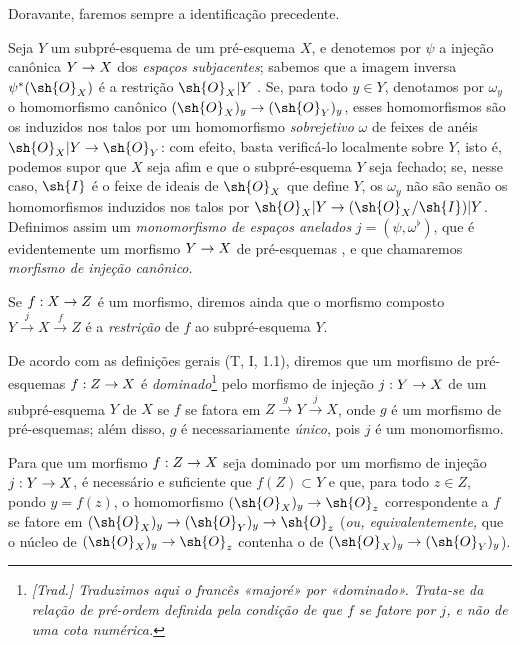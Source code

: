 \documentclass[oneside]{amsart}
\makeatletter
\newcommand{\ega@arrow}[2]{\mathchoice{#1}{#2}{#2}{#2}}
\renewcommand{\to}{\ega@arrow{\longrightarrow}{\rightarrow}}
\let\EGAOriginalLabel\label
\renewcommand{\label}[1]{\phantomsection\EGAOriginalLabel{#1}}
\makeatother
\begin{document}
Doravante, faremos sempre a identificação precedente.

\begin{env}[4.1.7]
\label{I.4.1.7}
Seja $Y$ um subpré-esquema de um pré-esquema $X$, e denotemos por $\psi$ a injeção canônica $Y\to X$ dos \emph{espaços subjacentes};
sabemos que a imagem inversa $\psi^*(\sh{O}_X)$ é a restrição $\sh{O}_X|Y$ .
Se, para todo $y\in Y$, denotamos por $\omega_y$ o homomorfismo canônico $(\sh{O}_X)_y\to(\sh{O}_Y)_y$, esses homomorfismos são os induzidos nos talos por um homomorfismo \emph{sobrejetivo} $\omega$ de feixes de anéis $\sh{O}_X|Y\to\sh{O}_Y$: com efeito, basta verificá-lo localmente sobre $Y$, isto é, podemos supor que $X$ seja afim e que o subpré-esquema $Y$ seja fechado; se, nesse caso, $\sh{I}$ é o feixe de ideais de $\sh{O}_X$ que define $Y$, os $\omega_y$ não são senão os homomorfismos induzidos nos talos por $\sh{O}_X|Y\to(\sh{O}_X/\sh{I})|Y$.
Definimos assim um \emph{monomorfismo de espaços anelados}  $j=(\psi,\omega^\flat)$, que é evidentemente um morfismo $Y\to X$ de pré-esquemas , e que chamaremos \emph{morfismo de injeção canônico}.

Se $f:X\to Z$ é um morfismo, diremos ainda que o morfismo composto $Y\xrightarrow{j}X\xrightarrow{f}Z$ é a \emph{restrição} de $f$ ao subpré-esquema $Y$.
\end{env}

\begin{env}[4.1.8]
\label{I.4.1.8}
De acordo com as definições gerais (T, I, 1.1), diremos que um morfismo de pré-esquemas $f:Z\to X$ é \emph{dominado}\footnote{\emph{[Trad.] Traduzimos aqui o francês «majoré» por «dominado». Trata-se da relação de pré-ordem definida pela condição de que $f$ se fatore por $j$, e não de uma cota numérica.}} pelo morfismo de injeção $j:Y\to X$ de um subpré-esquema $Y$ de $X$ se $f$ se fatora em $Z\xrightarrow{g}Y\xrightarrow{j}X$, onde $g$ é um morfismo de pré-esquemas;
além disso, $g$ é necessariamente \emph{único}, pois $j$ é um monomorfismo.
\end{env}

\begin{proposition}[4.1.9]
\label{I.4.1.9}
Para que um morfismo $f:Z\to X$ seja dominado por um morfismo de injeção $j:Y\to X$, é necessário e suficiente que $f(Z)\subset Y$ e que, para todo $z\in Z$, pondo $y=f(z)$, o homomorfismo $(\sh{O}_X)_y\to\sh{O}_z$ correspondente a $f$ se fatore em $(\sh{O}_X)_y\to(\sh{O}_Y)_y\to\sh{O}_z$ (\emph{ou, equivalentemente,} que o núcleo de $(\sh{O}_X)_y\to\sh{O}_z$ contenha o de $(\sh{O}_X)_y\to(\sh{O}_Y)_y$).
\end{proposition}
\end{document}
